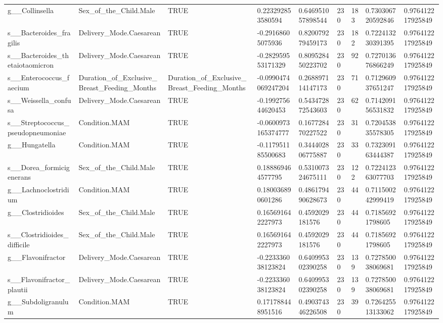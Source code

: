 \begin{longtable}{lllllllll}
g\_\_Collinsella & Sex\_of\_the\_Child.Male & TRUE & 0.223292853580594 & 0.646951057898544 & 230 & 183 & 0.730306720592846 & 0.976412217925849 \\
s\_\_Bacteroides\_fragilis & Delivery\_Mode.Caesarean & TRUE & -0.29168605075936 & 0.820079279459173 & 230 & 182 & 0.722413230391395 & 0.976412217925849 \\
s\_\_Bacteroides\_thetaiotaomicron & Delivery\_Mode.Caesarean & TRUE & -0.282959553171329 & 0.809528450223702 & 230 & 92 & 0.727013676866249 & 0.976412217925849 \\
s\_\_Enterococcus\_faecium & Duration\_of\_Exclusive\_Breast\_Feeding\_Months & Duration\_of\_Exclusive\_Breast\_Feeding\_Months & -0.0990474069247204 & 0.268897114147173 & 230 & 71 & 0.712960937651247 & 0.976412217925849 \\
s\_\_Weissella\_confusa & Delivery\_Mode.Caesarean & TRUE & -0.199275644620453 & 0.543472872543603 & 230 & 62 & 0.714209156531832 & 0.976412217925849 \\
s\_\_Streptococcus\_pseudopneumoniae & Condition.MAM & TRUE & -0.0600973165374777 & 0.167728470227522 & 230 & 31 & 0.720453835578305 & 0.976412217925849 \\
g\_\_Hungatella & Condition.MAM & TRUE & -0.117951185500683 & 0.344402806775887 & 230 & 33 & 0.732309163444387 & 0.976412217925849 \\
s\_\_Dorea\_formicigenerans & Sex\_of\_the\_Child.Male & TRUE & 0.188869464577795 & 0.531007324675111 & 230 & 122 & 0.722412363077703 & 0.976412217925849 \\
g\_\_Lachnoclostridium & Condition.MAM & TRUE & 0.180036890601286 & 0.486179490628673 & 230 & 44 & 0.711500242999419 & 0.976412217925849 \\
g\_\_Clostridioides & Sex\_of\_the\_Child.Male & TRUE & 0.165691642227973 & 0.4592029181576 & 230 & 44 & 0.71856921798605 & 0.976412217925849 \\
s\_\_Clostridioides\_difficile & Sex\_of\_the\_Child.Male & TRUE & 0.165691642227973 & 0.4592029181576 & 230 & 44 & 0.71856921798605 & 0.976412217925849 \\
g\_\_Flavonifractor & Delivery\_Mode.Caesarean & TRUE & -0.223336038123824 & 0.640995302390258 & 230 & 139 & 0.727850038069681 & 0.976412217925849 \\
s\_\_Flavonifractor\_plautii & Delivery\_Mode.Caesarean & TRUE & -0.223336038123824 & 0.640995302390258 & 230 & 139 & 0.727850038069681 & 0.976412217925849 \\
g\_\_Subdoligranulum & Condition.MAM & TRUE & 0.171788448951516 & 0.490374346226508 & 230 & 39 & 0.726425513133062 & 0.976412217925849 \\

\end{longtable}
